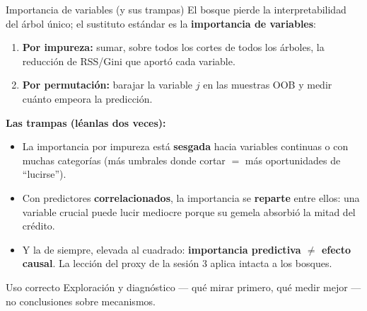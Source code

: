 \documentclass{beamer}
\newcommand{\1}{\mathbb{I}}
\begin{document}
\begin{frame}{Importancia de variables (y sus trampas)}
\small
El bosque pierde la interpretabilidad del árbol único; el sustituto estándar es la \textbf{importancia de variables}:
\begin{enumerate}\itemsep3pt
  \item \textbf{Por impureza:} sumar, sobre todos los cortes de todos los árboles, la reducción de RSS/Gini que aportó cada variable.
  \item \textbf{Por permutación:} barajar la variable $j$ en las muestras OOB y medir cuánto empeora la predicción.
\end{enumerate}
\pause

\vspace{0.15cm}
\textbf{Las trampas (léanlas dos veces):}
\begin{itemize}\itemsep4pt
  \item La importancia por impureza está \textbf{sesgada} hacia variables continuas o con muchas categorías (más umbrales donde cortar $=$ más oportunidades de ``lucirse''). \pause
  \item Con predictores \textbf{correlacionados}, la importancia se \textbf{reparte} entre ellos: una variable crucial puede lucir mediocre porque su gemela absorbió la mitad del crédito. \pause
  \item Y la de siempre, elevada al cuadrado: \textbf{importancia predictiva $\neq$ efecto causal}. La lección del proxy de la sesión 3 aplica intacta a los bosques.
\end{itemize}
\pause

\begin{block}{Uso correcto}
Exploración y diagnóstico --- qué mirar primero, qué medir mejor --- no conclusiones sobre mecanismos.
\end{block}
\end{frame}
\end{document}
